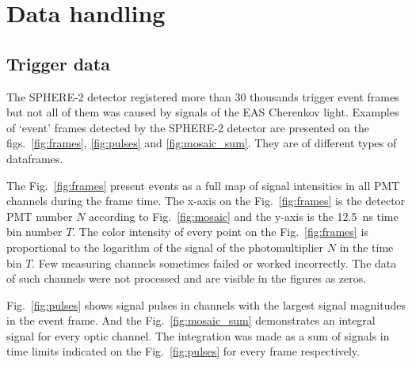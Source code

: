 \documentclass[final,5p,times,twocolumn]{elsarticle}
\begin{document}
\section{Data handling}


\subsection{Trigger data}

The SPHERE-2 detector registered more than 30 thousands trigger event frames but not all of them was caused by signals of the EAS Cherenkov light. 
Examples of `event' frames detected by the SPHERE-2 detector are presented on the figs.~\ref{fig:frames}, \ref{fig:pulses} and \ref{fig:mosaic_sum}. They are of different types of  dataframes. 

The Fig.~\ref{fig:frames} present events as a full map of signal intensities in all PMT channels during the frame time. The x-axis on the Fig.~\ref{fig:frames} is the detector PMT number $N$ according to Fig.~\ref{fig:mosaic} and the y-axis is the 12.5~ns time bin number $T$. The color intensity of every point on the Fig.~\ref{fig:frames} is proportional to the logarithm of the signal of the  photomultiplier $N$ in the time bin $T$. Few measuring channels sometimes failed or worked incorrectly. The data of such channels were not processed and are visible in the figures as zeros.

Fig.~\ref{fig:pulses} shows signal pulses in channels with the largest signal magnitudes in the event frame. And the Fig.~\ref{fig:mosaic_sum} demonstrates an integral signal for every optic channel. The integration was made as a sum of signals in time limits indicated on the Fig.~\ref{fig:pulses} for every frame respectively. 


\end{document}
